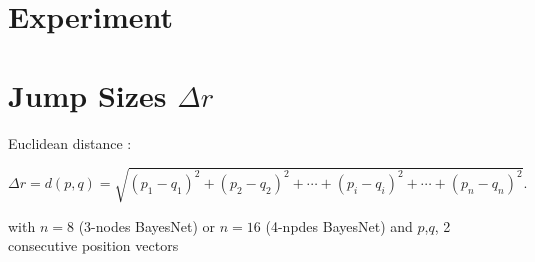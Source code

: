 











\section{Experiment}
\label{si:experiment}

\section{Jump Sizes $\Delta r$}

Euclidean distance : 

\begin{equation}
\Delta r = d(p, q) = \sqrt{(p_1- q_1)^2 + (p_2 - q_2)^2+\cdots+(p_i - q_i)^2+\cdots+(p_n - q_n)^2}.
\end{equation}

with $n=8$ (3-nodes BayesNet) or $n=16$ (4-npdes BayesNet) and $p$,$q$, 2 consecutive position vectors

